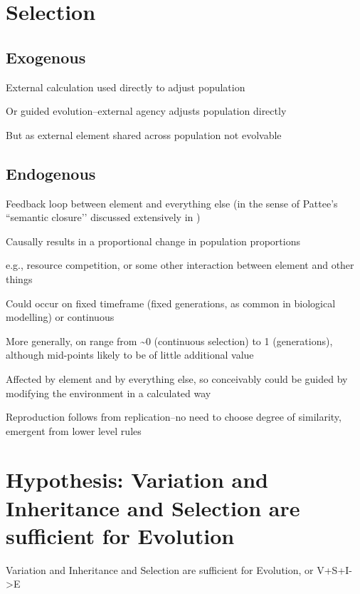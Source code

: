 \section{Selection}\label{selection}

\subsection{Exogenous}\label{exogenous}

External calculation used directly to adjust population

Or guided evolution--external agency adjusts population directly

But as external element shared across population not evolvable

\subsection{Endogenous}\label{endogenous}

Feedback loop between element and everything else (in the sense of Pattee’s ``semantic
closure’’ discussed extensively in \autocite[sect. 3.5]{Taylor2001})

Causally results in a proportional change in population proportions

e.g., resource competition, or some other interaction between element and other things

Could occur on fixed timeframe (fixed generations, as common in biological modelling) or continuous

More generally, on range from \textasciitilde{}0 (continuous selection) to 1 (generations), although mid-points likely to be of little additional value

Affected by element and by everything else, so conceivably could be guided by modifying the environment in a calculated way

Reproduction follows from replication--no need to choose degree of similarity, emergent from lower level rules

\section{Hypothesis: Variation and Inheritance and Selection are sufficient for Evolution}\label{h1}

\begin{hypothesis}
	Variation and Inheritance and Selection are sufficient for Evolution, or V+S+I-\textgreater{}E
\end{hypothesis}\label{hypothesis-1}

